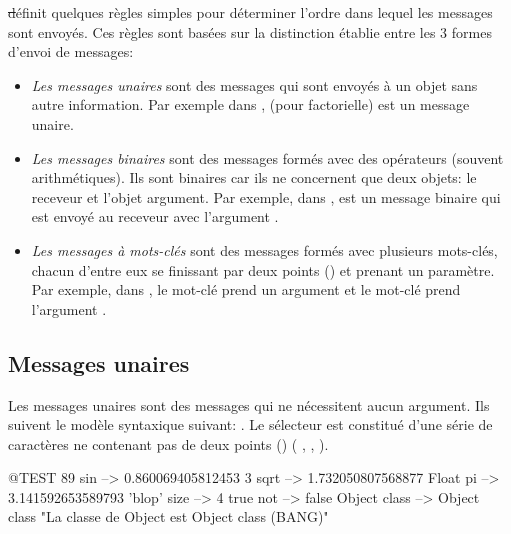\documentclass[a4paper,10pt,twoside]{book}
\begin{document}
\st d\'efinit quelques r\`egles simples pour d\'eterminer l'ordre dans lequel les messages sont envoy\'es. Ces r\`egles sont bas\'ees sur la distinction \'etablie entre les 3 formes d'envoi de messages: 
\begin{itemize}
\item \emph{Les messages unaires} sont des messages qui sont envoy\'es
  \`a un objet sans autre information. Par exemple dans ,  (pour factorielle) est un message unaire. 
\item  \emph{Les messages binaires} sont des messages form\'es avec
  des op\'erateurs (souvent arithm\'etiques). Ils sont binaires car
  ils ne concernent que deux objets: le receveur et l'objet
  argument. Par exemple, dans , \ct{+} est un message
  binaire qui est envoy\'e au receveur  avec l'argument . 
\item  \emph{Les messages \`a mots-cl\'es} sont des messages form\'es avec plusieurs mots-cl\'es, chacun d'entre eux se finissant par deux points (\ct{:}) et prenant un param\`etre.
Par exemple, dans , le mot-cl\'e 
prend un argument  et le mot-cl\'e  prend l'argument .
\end{itemize}

\subsection{Messages unaires}
Les messages unaires sont des messages qui ne n\'ecessitent aucun
argument. Ils suivent le mod\`ele syntaxique suivant: . Le s\'electeur est constitu\'e d'une s\'erie de
caract\`eres ne contenant pas de deux points (\ct{:}) (\eg
{}, , ).
\begin{code}{@TEST}
89 sin           --> 0.860069405812453
3 sqrt           --> 1.732050807568877
Float pi         --> 3.141592653589793
'blop' size     --> 4
true not        --> false
Object class --> Object class  "La classe de Object est Object class (BANG)"
\end{code}


\end{document}
